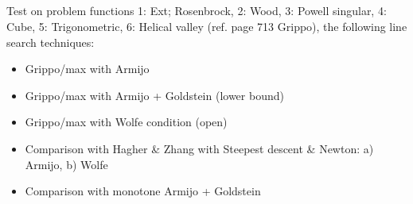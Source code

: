 \documentclass[a4paper,11pt]{article}
\numberwithin{equation}{section} %
\begin{document}

\subsection{}


Test on problem functions 1: Ext; Rosenbrock, 2: Wood, 3: Powell singular, 4: Cube, 5: Trigonometric, 6: Helical valley (ref. page 713 Grippo), the following line search techniques:
    
\begin{itemize}
    \item Grippo/max with Armijo
    \item Grippo/max with Armijo + Goldstein (lower bound)
    \item Grippo/max with Wolfe condition (open)
    \item Comparison with Hagher \& Zhang with Steepest descent \& Newton: a) Armijo, b) Wolfe
    \item Comparison with monotone Armijo + Goldstein
\end{itemize}
\end{document}
